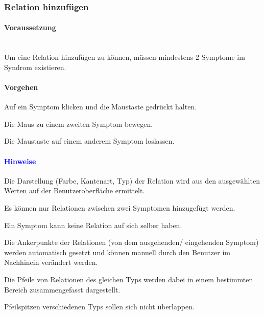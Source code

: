 \documentclass[enabledeprecatedfontcommands,fontsize=11pt,paper=a4,twoside]{scrartcl}
\newcounter{one}
\newcounter{two}[one]
\newcommand*{\hint}{\paragraph{\textcolor{blue}{Hinweise}}}
\newcommand*{\condition}{\paragraph{Voraussetzung}$\;$ \vspace{0.2cm}\\}
\newcommand*{\action}{\paragraph{Vorgehen}}
\let\tempone\itemize
\let\temptwo\enditemize
\renewenvironment{itemize}{\tempone\addtolength{\itemsep}{-10.0pt}}{\temptwo}
\let\origenumerate\enumerate
\let\origendenumerate\endenumerate
\renewenvironment{enumerate}{\origenumerate \addtolength{\itemsep}{-10.0pt}}{\origendenumerate}
\begin{document}
		\subsubsection{Relation hinzufügen}
		\condition
		Um eine Relation hinzufügen zu können, müssen mindestens 2 Symptome im Syndrom existieren. 
		\action
		\begin{enumerate}
			\item Auf ein Symptom klicken und die Maustaste gedrückt halten.
			\item Die Maus zu einem zweiten Symptom bewegen. 
			\item Die Maustaste auf einem anderem Symptom loslassen. 
		\end{enumerate}
		\hint
		\begin{itemize}
			\item Die Darstellung (Farbe, Kantenart, Typ) der Relation wird aus den ausgewählten Werten auf der Benutzeroberfläche ermittelt. 
			\item Es können nur Relationen zwischen zwei Symptomen hinzugefügt werden. 
			\item Ein Symptom kann keine Relation auf sich selber haben.
			\item Die Ankerpunkte der Relationen (von dem ausgehenden/ eingehenden Symptom) werden automatisch gesetzt und können manuell durch den Benutzer im Nachhinein verändert werden. 
			\item Die Pfeile von Relationen des gleichen Typs werden dabei in einem bestimmten Bereich zusammengefasst dargestellt. 
			\item Pfeilspitzen verschiedenen Typs sollen sich nicht überlappen.
		\end{itemize}
		
		\begin{figure}[ht!]
			\centering
		\end{figure}
		
\end{document}
